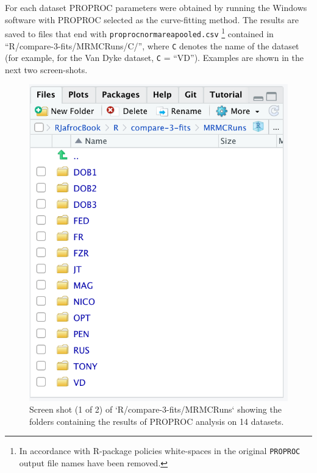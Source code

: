 \documentclass[
]{book}
\begin{document}
For each dataset PROPROC parameters were obtained by running the Windows software with PROPROC selected as the curve-fitting method. The results are saved to files that end with \texttt{proprocnormareapooled.csv} \footnote{In accordance with R-package policies white-spaces in the original \texttt{PROPROC} output file names have been removed.} contained in ``R/compare-3-fits/MRMCRuns/C/'', where \texttt{C} denotes the name of the dataset (for example, for the Van Dyke dataset, \texttt{C} = ``VD''). Examples are shown in the next two screen-shots.

\begin{figure}

{\centering \includegraphics{images/compare-3-fits/MRMCRuns} 

}

\caption{Screen shot (1 of 2) of `R/compare-3-fits/MRMCRuns` showing the folders containing the results of PROPROC analysis on 14 datasets.}\label{fig:rsm-3-fits-mrmc-runs}
\end{figure}
\end{document}
